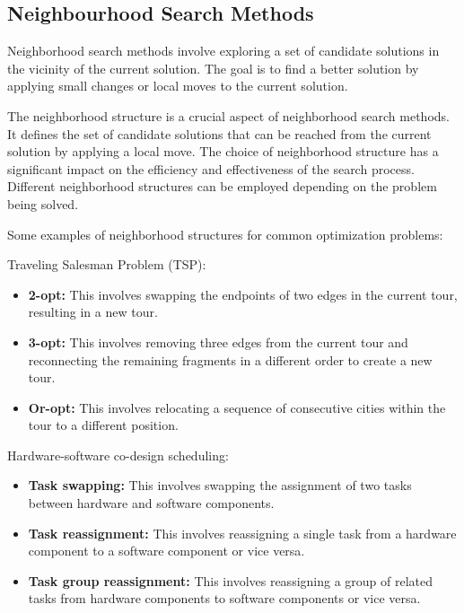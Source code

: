 \documentclass[conference]{IEEEtran}
\begin{document}
\subsection{Neighbourhood Search Methods}

Neighborhood search methods involve exploring a set of candidate solutions in the vicinity of the current solution. The goal is to find a better solution by applying small changes or local moves to the current solution.

The neighborhood structure is a crucial aspect of neighborhood search methods. It defines the set of candidate solutions that can be reached from the current solution by applying a local move. The choice of neighborhood structure has a significant impact on the efficiency and effectiveness of the search process. Different neighborhood structures can be employed depending on the problem being solved.

Some examples of neighborhood structures for common optimization problems:

Traveling Salesman Problem (TSP):

\begin{itemize}
\item \textbf{2-opt:} This involves swapping the endpoints of two edges in the current tour, resulting in a new tour.

\item \textbf{3-opt:} This involves removing three edges from the current tour and reconnecting the remaining fragments in a different order to create a new tour.

\item \textbf{Or-opt:} This involves relocating a sequence of consecutive cities within the tour to a different position.

\end{itemize}

Hardware-software co-design scheduling:

\begin{itemize}
    \item \textbf{Task swapping:} This involves swapping the assignment of two tasks between hardware and software components.
    \item \textbf{Task reassignment:} This involves reassigning a single task from a hardware component to a software component or vice versa.
    \item \textbf{Task group reassignment:} This involves reassigning a group of related tasks from hardware components to software components or vice versa.
\end{itemize}
\end{document}
